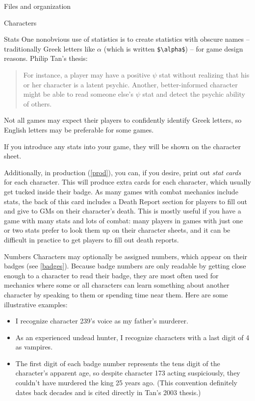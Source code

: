 \documentclass[sheet]{GameTexBase}
\begin{document}
\begin{section}{Files and organization}
\begin{subsection}{Characters}
\begin{subsubsection}{Stats}
One nonobvious use of statistics is to create statistics with obscure names -- traditionally Greek letters like $\alpha$ (which is written \lstinline|$\alpha$|) -- for game design reasons.  Philip Tan's thesis:
\begin{quote}
For instance, a player may have a positive $\psi$ stat without realizing that his
or her character is a latent psychic. Another, better-informed character might be able to
read someone else’s $\psi$ stat and detect the psychic ability of others.
\end{quote}
Not all games may expect their players to confidently identify Greek letters, so English letters may be preferable for some games.

If you introduce any stats into your game, they will be shown on the character sheet.  

Additionally, in production (\ref{prod}), you can, if you desire, print out \emph{stat cards} for each character.  This will produce extra cards for each character, which usually get tucked inside their badge.  As many games with combat mechanics include stats, the back of this card includes a Death Report section for players to fill out and give to GMs on their character's death.  This is mostly useful if you have a game with many stats and lots of combat: many players in games with just one or two stats prefer to look them up on their character sheets, and it can be difficult in practice to get players to fill out death reports.
\end{subsubsection}
\begin{subsubsection}{Numbers}
\label{charnumber}
Characters may optionally be assigned numbers, which appear on their badges (see \ref{badges}). Because badge numbers are only readable by getting close enough to a character to read their badge,
they are most often used for mechanics where some or all characters can learn something about another character by speaking to them or spending time near them.  Here are some illustrative examples:
\begin{itemize}
\item I recognize character 239's voice as my father's murderer.
\item As an experienced undead hunter, I recognize characters with a last digit of 4 as vampires.
\item The first digit of each badge number represents the tens digit of the character's apparent age, so despite character 173 acting suspiciously, they couldn't have murdered the king 25 years ago.  (This convention definitely dates back decades and is cited directly in Tan's 2003 thesis.)
\end{itemize}


\end{subsubsection}
\end{subsection}
\end{section}
\end{document}

